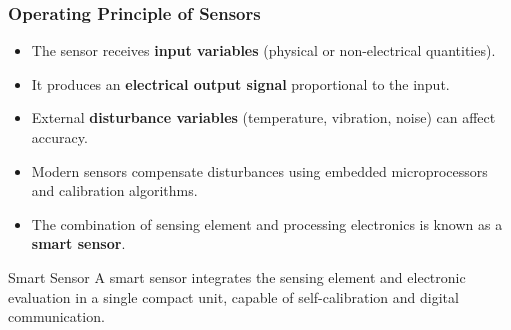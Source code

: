 \begin{frame}
	\frametitle{Operating Principle of Sensors}
    \begin{itemize}
        \item The sensor receives \textbf{input variables} (physical or non-electrical quantities).
        \item It produces an \textbf{electrical output signal} proportional to the input.
        \item External \textbf{disturbance variables} (temperature, vibration, noise) can affect accuracy.
        \item Modern sensors compensate disturbances using embedded microprocessors and calibration algorithms.
        \item The combination of sensing element and processing electronics is known as a \textbf{smart sensor}.
    \end{itemize}
    \begin{block}{Smart Sensor}
        A smart sensor integrates the sensing element and electronic evaluation in a single compact unit, capable of self-calibration and digital communication.
    \end{block}
\end{frame}

